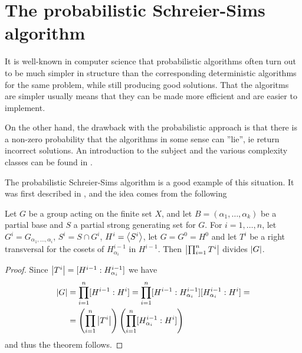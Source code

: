 \chapter{The probabilistic Schreier-Sims algorithm}
It is well-known in computer science that probabilistic algorithms
often turn out to be much simpler in structure than the corresponding
deterministic algorithms for the same problem, while still producing
good solutions. That the algoritms are simpler usually means that they
can be made more efficient and are easier to implement. 

On the other hand, the drawback with the probabilistic approach is
that there is a non-zero probability that the algorithms in some sense
can ''lie'', ie return incorrect solutions. An introduction to the
subject and the various complexity classes can be found in
\cite{papadimitriou94}.

The probabilistic Schreier-Sims algorithm is a good example of this
situation. It was first described in \cite{leon80}, and the idea comes from the following
\begin{theorem} \label{thm_rand_schreier1}
  Let $G$ be a group acting on the finite set $X$, and let $B =
  (\alpha_1, \dotsc, \alpha_k)$ be a partial base and $S$ a partial
  strong generating set for $G$. For $i = 1, \dotsc, n$, let $G^i =
  G_{\alpha_1, \dotsc, \alpha_i}$, $S^i = S \cap G^i$, $H^i =
  \left\langle S^i \right\rangle$, let $G = G^0 = H^0$ and let $T^i$ be a right transversal for the cosets of
  $H^{i - 1}_{\alpha_i}$ in $H^{i - 1}$. Then $\left\lvert \prod_{i = 1}^n T^i \right\rvert$ divides $\left\lvert G \right\rvert$.
\end{theorem}
\begin{proof}
Since $\left\lvert T^i \right\rvert = [H^{i - 1} : H^{i - 1}_{\alpha_i}]$ we have 
\begin{equation}
\begin{split}
\left\lvert G \right\rvert &= \prod_{i = 1}^n [H^{i - 1} : H^i] = \prod_{i = 1}^n [H^{i - 1} : H^{i - 1}_{\alpha_i}] [H^{i - 1}_{\alpha_i} : H^i] = \\
&= \left( \prod_{i = 1}^n \left\lvert T^i \right\rvert \right) \left( \prod_{i = 1}^n [H^{i - 1}_{\alpha_i} : H^i] \right)
\end{split}
\end{equation}
and thus the theorem follows.
\end{proof}


